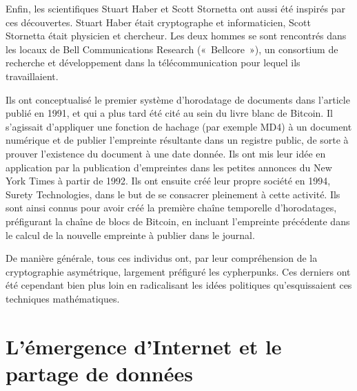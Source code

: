 Enfin, les scientifiques Stuart Haber et Scott Stornetta ont aussi été inspirés par ces découvertes. Stuart Haber était cryptographe et informaticien, Scott Stornetta était physicien et chercheur. Les deux hommes se sont rencontrés dans les locaux de Bell Communications Research («~Bellcore~»), un consortium de recherche et développement dans la télécommunication pour lequel ils travaillaient.

Ils ont conceptualisé le premier système d'horodatage de documents dans l'article  publié en 1991, et qui a plus tard été cité au sein du livre blanc de Bitcoin. Il s'agissait d'appliquer une fonction de hachage (par exemple MD4) à un document numérique et de publier l'empreinte résultante dans un registre public, de sorte à prouver l'existence du document à une date donnée. Ils ont mis leur idée en application par la publication d'empreintes dans les petites annonces du New York Times à partir de 1992. Ils ont ensuite créé leur propre société en 1994, Surety Technologies, dans le but de se consacrer pleinement à cette activité. Ils sont ainsi connus pour avoir créé la première chaîne temporelle d'horodatages, préfigurant la chaîne de blocs de Bitcoin, en incluant l'empreinte précédente dans le calcul de la nouvelle empreinte à publier dans le journal.

De manière générale, tous ces individus ont, par leur compréhension de la cryptographie asymétrique, largement préfiguré les cypherpunks. Ces derniers ont été cependant bien plus loin en radicalisant les idées politiques qu'esquissaient ces techniques mathématiques.

\section*{L'émergence d'Internet et le partage de données} %

